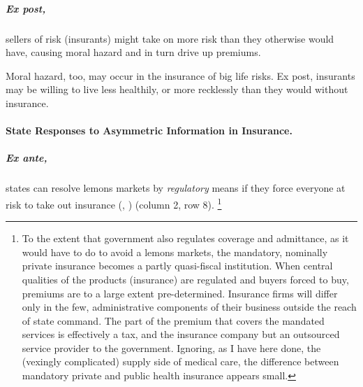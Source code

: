 \subparagraph[Moral Hazard]{Ex post,}  \label{sec:moral-hazard} sellers of risk (insurants) might take on more risk than they otherwise would have, causing moral hazard and in turn drive up premiums.

Moral hazard, too, may occur in the insurance of big life risks.
Ex post, insurants may be willing to live less healthily, or more recklessly than they would without insurance.

\paragraph{State Responses to Asymmetric Information in Insurance.}  \label{sec:state-insurance}

\subparagraph{Ex ante,} states can resolve lemons markets by \emph{regulatory} means if they force everyone at risk to take out insurance (\citealt{Akerlof-1970-aa}, \citealt{Barr})
(column 2, row 8).
\footnote{
	To the extent that government also regulates coverage and admittance, as it would have to do to avoid a lemons markets, the mandatory, nominally private insurance becomes a partly quasi-fiscal institution.
	When central qualities of the products (insurance) are regulated and buyers forced to buy, premiums are to a large extent pre-determined.
	Insurance firms will differ only in the few, administrative components of their business outside the reach of state command.
	The part of the premium that covers the mandated services is effectively a tax, and the insurance company but an outsourced service provider to the government. Ignoring, as I have here done, the (vexingly complicated) supply side of medical care, the difference between mandatory private and public health insurance appears small.
}

